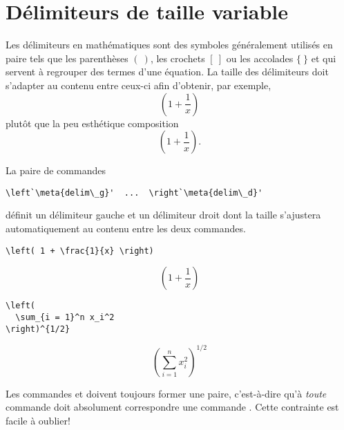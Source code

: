 \section{Délimiteurs de taille variable}
\label{sec:math:delimiteurs}

Les délimiteurs en mathématiques sont des symboles généralement
utilisés en paire tels que les parenthèses $(~)$, les crochets $[~]$
ou les accolades $\{~\}$ et qui servent à regrouper des termes d'une
équation. La taille des délimiteurs doit s'adapter au contenu entre
ceux-ci afin d'obtenir, par exemple,
\begin{equation*}
  \left( 1 + \frac{1}{x} \right)
\end{equation*}
plutôt que la peu esthétique composition
\begin{equation*}
  (1 + \frac{1}{x}).
\end{equation*}

La paire de commandes
\begin{lstlisting}
\left`\meta{delim\_g}'  ...  \right`\meta{delim\_d}'
\end{lstlisting}
définit un délimiteur gauche  et un délimiteur droit
 dont la taille s'ajustera automatiquement au contenu
entre les deux commandes.
\begin{demo}
  \begin{texample}
\begin{lstlisting}
\left( 1 + \frac{1}{x} \right)
\end{lstlisting}
    \producing
    \begin{equation*}
      \left( 1 + \frac{1}{x} \right)
    \end{equation*}
  \end{texample}

  \begin{texample}
\begin{lstlisting}
\left(
  \sum_{i = 1}^n x_i^2
\right)^{1/2}
\end{lstlisting}
    \producing
    \begin{equation*}
      \left(
        \sum_{i = 1}^n x_i^2
      \right)^{1/2}
    \end{equation*}
  \end{texample}
\end{demo}
Les commandes \cmd{\left} et \cmd{\right} doivent toujours former une
paire, c'est-à-dire qu'à \emph{toute} commande \cmdprint{\left} doit
absolument correspondre une commande \cmdprint{\right}. Cette
contrainte est facile à oublier!

